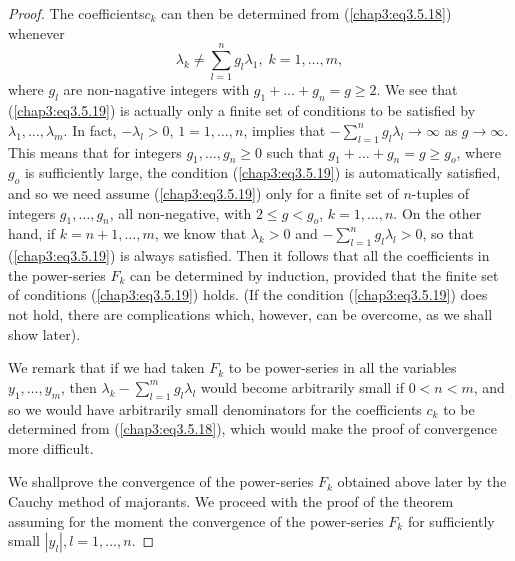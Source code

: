 \begin{proof}
The coefficients\pageoriginale $c_k$ can then be determined from
(\ref{chap3:eq3.5.18}) whenever 
\begin{equation*}
\lambda_k \neq \sum\limits^n_{l=1} g_l \lambda_1, \; k  = 1, \ldots,
m, \tag{3.5.19}\label{chap3:eq3.5.19} 
\end{equation*}
where $g_l$ are non-nagative integers with $g_1 + \ldots + g_n = g
\geq 2$. We see that (\ref{chap3:eq3.5.19}) is actually only a finite
set of conditions to be satisfied by $\lambda_1, \ldots,
\lambda_m$. In fact, $-\lambda_l > 0$, $1 = 1, \ldots, n$, implies
that $-\sum\limits^n_{l=1} g_l \lambda_l \to \infty$ as $g \to
\infty$. This means that for integers $g_1, \ldots, g_n \geq 0$ such
that $g_1 + \ldots + g_n = g\geq g_o$, where $g_o$ is sufficiently
large, the condition (\ref{chap3:eq3.5.19}) is automatically
satisfied, and so we need assume (\ref{chap3:eq3.5.19}) only for a
finite set of $n$-tuples of integers $g_1, \ldots, g_n$, all
non-negative, with $2 \leq g <g_o$, $k =1 , \ldots,n$. On the other
hand, if $k = n+1, \ldots, m$, we know that $\lambda_k > 0$ and
$-\sum\limits^n_{l=1} g_l \lambda_l > 0$, so that
(\ref{chap3:eq3.5.19}) is always satisfied. Then it follows that all
the coefficients in the power-series $F_k$ can be determined by
induction, provided that the finite set of conditions
(\ref{chap3:eq3.5.19}) holds. (If the condition (\ref{chap3:eq3.5.19})
does not hold, there are complications which, however, can be
overcome, as we shall show later). 

We remark that if we had taken $F_k$ to be power-series in all the
variables $y_1, \ldots, y_m$, then $\lambda_k - \sum\limits^m_{l=1}
g_l \lambda_l$ would become arbitrarily small if $0 < n <m$, and so we
would have arbitrarily small denominators for the coefficients $c_k$
to be determined from (\ref{chap3:eq3.5.18}), which would make the
proof of convergence more difficult. 


We shall\pageoriginale prove the convergence of the power-series $F_k$
obtained above later by the Cauchy method of majorants. We proceed
with the proof of the theorem assuming for the moment the convergence
of the power-series $F_k$ for sufficiently small $|y_l|, l = 1,
\ldots, n$. 


\end{proof}
